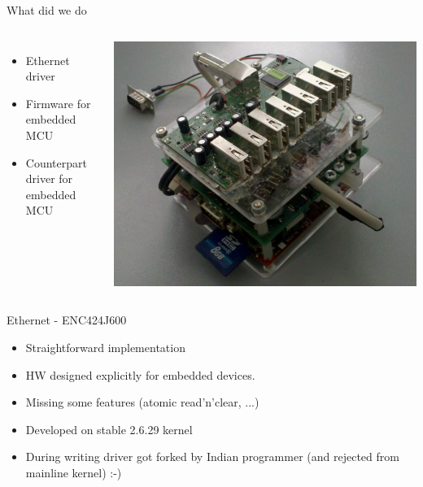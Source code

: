 \documentclass{beamer}
\begin{document}
\begin{frame}{What did we do}

\begin{columns}[c]

\begin{itemize}
  \item Ethernet driver
  \item Firmware for embedded MCU
  \item Counterpart driver for embedded MCU 
\end{itemize}

\includegraphics[width=\textwidth]{../img/main}

\end{columns}
\end{frame}

\begin{frame}{Ethernet - ENC424J600}
\begin{itemize}
  \item Straightforward implementation
	\item HW designed explicitly for embedded devices.
	\item Missing some features (atomic read'n'clear, ...)
\end{itemize}

\begin{itemize}
\item Developed on stable 2.6.29 kernel
\item During writing driver got forked by Indian programmer (and rejected from mainline kernel) :-)
\end{itemize}
\end{frame}
\end{document}
